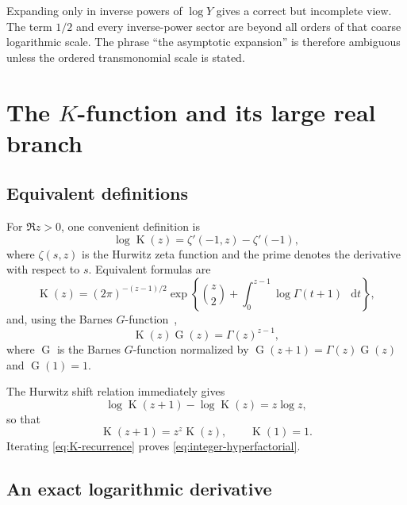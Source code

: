 \documentclass[11pt,oneside]{article}
\theoremstyle{plain}
\theoremstyle{definition}
\theoremstyle{remark}
\newcommand{\Kfun}{\operatorname{K}}
\newcommand{\Gfun}{\operatorname{G}}
\newcommand{\dd}{\mathop{}\!\mathrm{d}}
\begin{document}
\begin{warningbox}
Expanding only in inverse powers of \(\log Y\) gives a correct but incomplete
view.  The term \(1/2\) and every inverse-power sector are beyond all orders of
that coarse logarithmic scale.  The phrase ``the asymptotic expansion'' is
therefore ambiguous unless the ordered transmonomial scale is stated.
\end{warningbox}

\section{The \texorpdfstring{\(K\)-function}{K-function} and its large real branch}
\label{sec:K-background}

\subsection{Equivalent definitions}

For \(\Re z>0\), one convenient definition is~\cite{Adamchik1998,DLMF25}
\begin{equation}
 \log\Kfun(z)=\zeta'(-1,z)-\zeta'(-1),
 \label{eq:K-Hurwitz}
\end{equation}
where \(\zeta(s,z)\) is the Hurwitz zeta function and the prime denotes the
derivative with respect to \(s\).  Equivalent formulas are
\begin{equation}
 \Kfun(z)=(2\pi)^{-(z-1)/2}
 \exp\!\left\{\binom{z}{2}+
       \int_0^{z-1}\log\Gamma(t+1)\,\dd t\right\},
 \label{eq:K-integral}
\end{equation}
and, using the Barnes \(G\)-function~\cite{DLMF5,Vardi1988},
\begin{equation}
 \Kfun(z)\Gfun(z)=\Gamma(z)^{z-1},
 \label{eq:K-Barnes}
\end{equation}
where \(\Gfun\) is the Barnes \(G\)-function normalized by
\(\Gfun(z+1)=\Gamma(z)\Gfun(z)\) and \(\Gfun(1)=1\).

The Hurwitz shift relation immediately gives
\begin{equation}
 \log\Kfun(z+1)-\log\Kfun(z)=z\log z,
 \label{eq:K-log-recurrence}
\end{equation}
so that
\begin{equation}
 \Kfun(z+1)=z^z\Kfun(z),\qquad \Kfun(1)=1.
 \label{eq:K-recurrence}
\end{equation}
Iterating \eqref{eq:K-recurrence} proves \eqref{eq:integer-hyperfactorial}.

\subsection{An exact logarithmic derivative}
\end{document}
